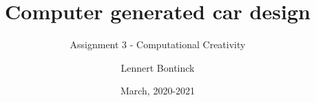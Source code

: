\title{Computer generated car design}
\subtitle{Assignment 3 - Computational Creativity}
\author{Lennert Bontinck}
\date{March, 2020-2021}
